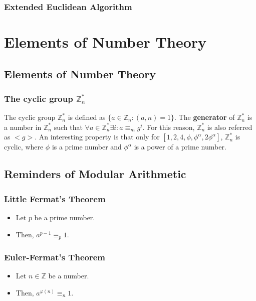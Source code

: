 \documentclass[12pt, a4paper, english]{report}
\begin{document}
\subsection{Extended Euclidean Algorithm}

\chapter{Elements of Number Theory}

\section{Elements of Number Theory}
\subsection{The cyclic group $\mathbb{Z}_{n}^{*}$}
The cyclic group $\mathbb{Z}_{n}^{*}$ is defined as $\{a \in \mathbb{Z}_{n}: (a,n) = 1\}$.\newline
The \textbf{generator} of $\mathbb{Z}_{n}^{*}$ is a number in $\mathbb{Z}_{n}^{*}$ such that
$\forall a \in \mathbb{Z}_{n}^{*} \exists i: a \equiv_{m} g^{i}$.
For this reason, $\mathbb{Z}_{n}^{*}$ is also referred as $< g >$.\newline
An interesting property is that only for $[1,2,4, \phi, \phi^{\alpha}, 2 \phi^{\alpha}]$,
 $\mathbb{Z}_{n}^{*}$ is cyclic, where $\phi$ is a prime number and $\phi^\alpha$ is a power of a prime number.\newline

\section{Reminders of Modular Arithmetic}
\subsection{Little Fermat's Theorem}\label{little_fermat_th}
\begin{itemize}
    \item Let $p$ be a prime number.
    \item Then, $a^{p-1} \equiv_{p} 1$.
\end{itemize}

\subsection{Euler-Fermat's Theorem}\label{euler_fermat_th}
\begin{itemize}
    \item Let $n \in \mathbb{Z}$ be a number.
    \item Then, $a^{\varphi(n)} \equiv_{n} 1$.
\end{itemize}
\end{document}
